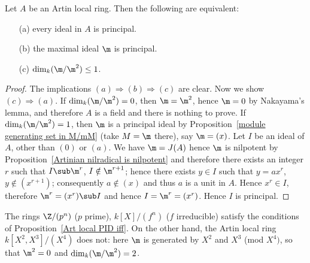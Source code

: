\begin{proposition}\label{Art local PID iff}
Let $A$ be an Artin local ring. Then the following are equivalent:
\begin{itemize}
\item[(a)] every ideal in $A$ is principal.
\item[(b)] the maximal ideal $\m$ is principal.
\item[(c)] $\dim_k(\m/\m^2)\leq 1$.
\end{itemize}
\end{proposition}
\begin{proof}
The implications $(a)\Rightarrow(b)\Rightarrow(c)$ are clear. Now we show $(c)\Rightarrow(a)$. If $\dim_k(\m/\m^2)=0$, then $\m=\m^2$, hence $\m=0$ by Nakayama's lemma, and therefore $A$ is a field and there is nothing to prove. If $\dim_k(\m/\m^2)=1$, then $\m$ is a principal ideal by Proposition~\ref{module generating set in M/mM} (take $M=\m$ there), say $\m=(x)$. Let $I$ be an ideal of $A$, other than $(0)$ or $(a)$. We have $\m=J(A)$ hence $\m$ is nilpotent by Proposition~\ref{Artinian nilradical is nilpotent} and therefore there exists an integer $r$ such that $I\sub\m^r$, $I\notin\m^{r+1}$; hence there exists $y\in I$ such that $y=ax^r$, $y\notin(x^{r+1})$; consequently $a\notin(x)$ and thus $a$ is a unit in $A$. Hence $x^r\in I$, therefore $\m^r=(x^r)\sub I$ and hence $I=\m^r=(x^r)$. Hence $I$ is principal.
\end{proof}
\begin{example}
The rings $\Z/(p^n)$ ($p$ prime), $k[X]/(f^n)$ ($f$ irreducible) satisfy the conditions of Proposition~\ref{Art local PID iff}. On the other hand, the Artin local ring $k[X^2,X^3]/(X^4)$ does not: here $\m$ is generated by $X^2$ and $X^3$ (mod $X^4)$, so that $\m^2=0$ and $\dim_k(\m/\m^2)=2$.
\end{example}
